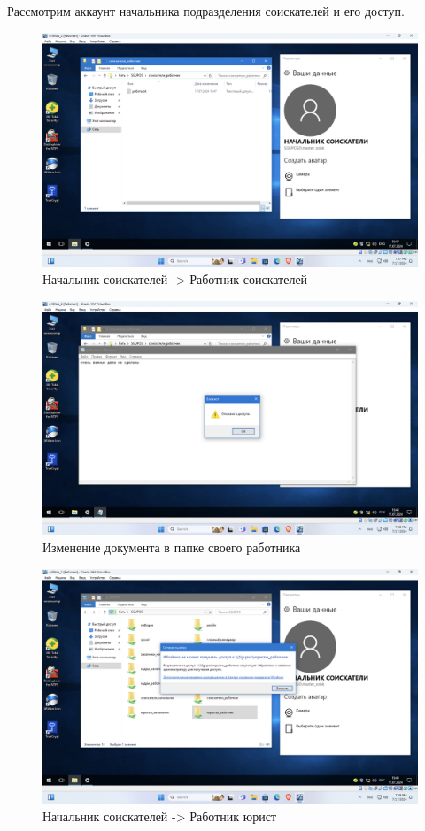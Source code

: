 Рассмотрим аккаунт начальника подразделения соискателей и его доступ.
\begin{figure}[H]
  \centering
  \includegraphics[width=1\textwidth]{pict/prac/35}
  \caption{Начальник соискателей -> Работник соискателей}
  \label{fig:34}
\end{figure}

\begin{figure}[H]
  \centering
  \includegraphics[width=1\textwidth]{pict/prac/36}
  \caption{Изменение документа в папке своего работника}
  \label{fig:35}
\end{figure}

\begin{figure}[H]
  \centering
  \includegraphics[width=1\textwidth]{pict/prac/39}
  \caption{Начальник соискателей -> Работник юрист}
  \label{fig:38}
\end{figure}

